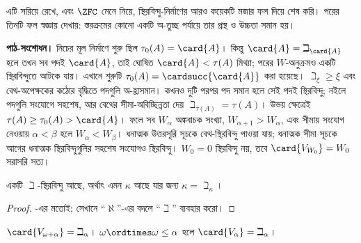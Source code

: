 \documentclass[../../../include/open-logic-section]{subfiles}
\begin{document}
এটি সরিয়ে রেখে, এবং $\ZFC$ মেনে নিয়ে,
স্থিরবিন্দু-নির্মাণের আরও কয়েকটি মজার ফল দিয়ে
শেষ করি। পরের তিনটি ফল স্বজ্ঞায় দেখায়:
স্তরক্রমের কোনো একটি অ-তুচ্ছ পর্যায়ে তার
প্রস্থ ও উচ্চতা সমান হয়।
\par\noindent\textbf{পাঠ-সংশোধন।} নিচের মূল নির্মাণে শুরু ছিল $\tau_0(A)=\card{A}$। কিন্তু
$\card{A}=\beth_{\card{A}}$ হলে তখন সব পদই $\card{A}$,
তাই ঘোষিত $\card{A}<\tau(A)$ মিথ্যা; পরের $W$-অনুক্রমও
একটি স্থিরবিন্দুতে আটকে যায়। এখানে শুরুটি
$\tau_0(A)=\cardsucc{\card{A}}$ করা হয়েছে।
$\beth_\xi\geq\xi$ এবং বেথ-অপেক্ষকের কঠোর বৃদ্ধিতে
পদগুলি অ-হ্রাসমান। কখনও দুটি পরপর পদ সমান হলে সেই পদই
স্থিরবিন্দু; নইলে পদগুলি সংযোগে সহশেষ, আর বেথের সীমা-অবিচ্ছিন্নতা
দেয় $\beth_{\tau(A)}=\tau(A)$। উভয় ক্ষেত্রেই
$\tau(A)\geq\tau_0(A)>\card{A}$। ফলে সব $W_\alpha$
অঙ্কবাচক সংখ্যা, $W_{\alpha+1}>W_\alpha$, এবং সীমায় সংযোগ
নেওয়ায় $\alpha<\beta$ হলে $W_\alpha<W_\beta$। ধনাত্মক
উত্তরসূরি সূচকে বেথ-স্থিরবিন্দু পাওয়া যায়; ধনাত্মক সীমা সূচকে
আগের ধনাত্মক স্থিরবিন্দুগুলির সহশেষ সংযোগও স্থিরবিন্দু।
$W_0=0$ স্থিরবিন্দু নয়, তবে $\card{V_{W_0}}=W_0$ সরাসরি সত্য।

\begin{prop}
একটি $\beth$-স্থিরবিন্দু আছে, অর্থাৎ এমন
$\kappa$ আছে যার জন্য $\kappa=\beth_\kappa$।
\end{prop}

\begin{proof}
-এর মতোই; সেখানে ``$\aleph$''-এর
বদলে ``$\beth$'' ব্যবহার করো।
\end{proof}

\begin{prop}
$\card{V_{\omega+\alpha}}=\beth_{\alpha}$।
$\omega\ordtimes\omega\leq\alpha$ হলে
$\card{V_\alpha}=\beth_\alpha$।
\end{prop}
\end{document}
